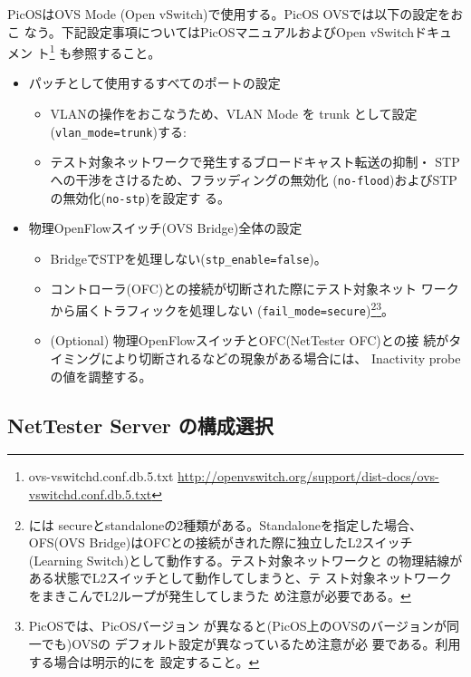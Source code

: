 PicOSはOVS Mode (Open vSwitch)で使用する。PicOS OVSでは以下の設定をおこ
なう。下記設定事項についてはPicOSマニュアルおよびOpen vSwitchドキュメン
ト\footnote{ovs-vswitchd.conf.db.5.txt
\url{http://openvswitch.org/support/dist-docs/ovs-vswitchd.conf.db.5.txt}}
も参照すること。
\begin{itemize}
 \item パッチとして使用するすべてのポートの設定~\cite{l1pjtech}
       \begin{itemize}
        \item VLANの操作をおこなうため、VLAN Mode を trunk として設定
              (\verb|vlan_mode=trunk|)する:
        \item テスト対象ネットワークで発生するブロードキャスト転送の抑制・
              STPへの干渉をさけるため、フラッディングの無効化
              (\verb|no-flood|)およびSTPの無効化(\verb|no-stp|)を設定す
              る。
       \end{itemize}
 \item 物理OpenFlowスイッチ(OVS Bridge)全体の設定
       \begin{itemize}
        \item BridgeでSTPを処理しない(\verb|stp_enable=false|)。
        \item コントローラ(OFC)との接続が切断された際にテスト対象ネット
              ワークから届くトラフィックを処理しない
              (\verb|fail_mode=secure|)\footnote{には
              secureとstandaloneの2種類がある。Standaloneを指定した場合、
              OFS(OVS Bridge)はOFCとの接続がきれた際に独立したL2スイッチ
              (Learning Switch)として動作する。テスト対象ネットワークと
              の物理結線がある状態でL2スイッチとして動作してしまうと、テ
              スト対象ネットワークをまきこんでL2ループが発生してしまうた
              め注意が必要である。}\footnote{PicOSでは、PicOSバージョン
              が異なると(PicOS上のOVSのバージョンが同一でも)OVSの
              デフォルト設定が異なっているため注意が必
              要である。利用する場合は明示的にを
              設定すること。}。
        \item (Optional) 物理OpenFlowスイッチとOFC(NetTester OFC)との接
              続がタイミングにより切断されるなどの現象がある場合には、
              Inactivity probe の値を調整する。
       \end{itemize}
\end{itemize}

  
  \subsection{NetTester Server の構成選択}
  \label{sec:nettester-server-deploy-pattern}

